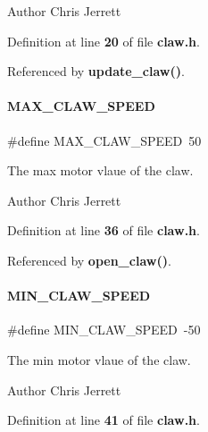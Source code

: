 \begin{DoxyAuthor}{Author}
Chris Jerrett 
\end{DoxyAuthor}


Definition at line \textbf{ 20} of file \textbf{ claw.\+h}.



Referenced by \textbf{ update\+\_\+claw()}.

\mbox{\label{claw_8h_ae3be50b28977dac719f086e131ba8fd7}} 
\paragraph{M\+A\+X\+\_\+\+C\+L\+A\+W\+\_\+\+S\+P\+E\+ED}
{\footnotesize\ttfamily \#define M\+A\+X\+\_\+\+C\+L\+A\+W\+\_\+\+S\+P\+E\+ED~50}



The max motor vlaue of the claw. 

\begin{DoxyAuthor}{Author}
Chris Jerrett 
\end{DoxyAuthor}


Definition at line \textbf{ 36} of file \textbf{ claw.\+h}.



Referenced by \textbf{ open\+\_\+claw()}.

\mbox{\label{claw_8h_a7306e61a4209c74862aa81d7b3de74e5}} 
\paragraph{M\+I\+N\+\_\+\+C\+L\+A\+W\+\_\+\+S\+P\+E\+ED}
{\footnotesize\ttfamily \#define M\+I\+N\+\_\+\+C\+L\+A\+W\+\_\+\+S\+P\+E\+ED~-\/50}



The min motor vlaue of the claw. 

\begin{DoxyAuthor}{Author}
Chris Jerrett 
\end{DoxyAuthor}


Definition at line \textbf{ 41} of file \textbf{ claw.\+h}.



